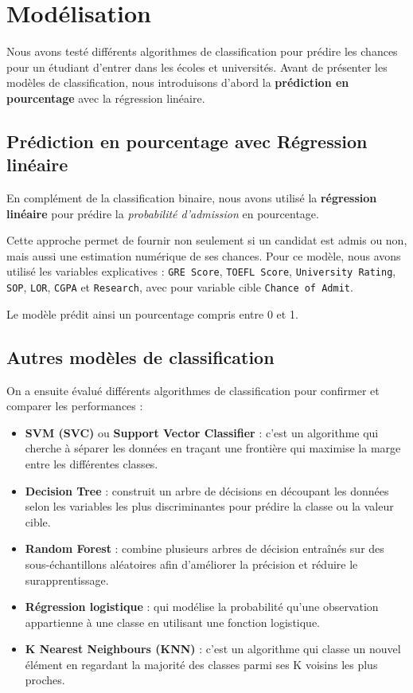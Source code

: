 \chapter{Modélisation}

Nous avons testé différents algorithmes de classification pour prédire les chances pour un étudiant d'entrer dans les écoles et universités. Avant de présenter les modèles de classification, nous introduisons d'abord la \textbf{prédiction en pourcentage} avec la régression linéaire.

\section{Prédiction en pourcentage avec Régression linéaire}
En complément de la classification binaire, nous avons utilisé la \textbf{régression linéaire} pour prédire la \emph{probabilité d'admission} en pourcentage.  

Cette approche permet de fournir non seulement si un candidat est admis ou non, mais aussi une estimation numérique de ses chances. Pour ce modèle, nous avons utilisé les variables explicatives : \texttt{GRE Score}, \texttt{TOEFL Score}, \texttt{University Rating}, \texttt{SOP}, \texttt{LOR}, \texttt{CGPA} et \texttt{Research}, avec pour variable cible \texttt{Chance of Admit}.

Le modèle prédit ainsi un pourcentage compris entre 0 et 1.

\section{Autres modèles de classification}
On a ensuite évalué différents algorithmes de classification pour confirmer et comparer les performances :

\begin{itemize}
	\item \textbf{SVM (SVC)} ou \textbf{Support Vector Classifier} : c'est un algorithme qui cherche à séparer les données en traçant une frontière qui maximise la marge entre les différentes classes.
	\item \textbf{Decision Tree} : construit un arbre de décisions en découpant les données selon les variables les plus discriminantes pour prédire la classe ou la valeur cible.
	\item \textbf{Random Forest} : combine plusieurs arbres de décision entraînés sur des sous-échantillons aléatoires afin d’améliorer la précision et réduire le surapprentissage.
	\item \textbf{Régression logistique} : qui modélise la probabilité qu’une observation appartienne à une classe en utilisant une fonction logistique.
	\item \textbf{K Nearest Neighbours (KNN)} : c’est un algorithme qui classe un nouvel élément en regardant la majorité des classes parmi ses K voisins les plus proches.
\end{itemize}


